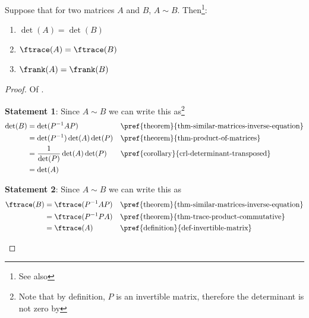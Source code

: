 \begin{thm}\label{thm-similar-matrix-properties:1}
	Suppose that for two matrices $A$ and $B$, $A \sim B$. Then\footnote{See also
		}:
	\begin{enumerate}
		\item $\det(A)=\det(B)$
		\item $\ftrace(A)=\ftrace(B)$
		\item $\frank(A)=\frank(B)$
	\end{enumerate}
\end{thm}

\begin{proof}
	Of .
	\begin{flushleft}
		\textbf{Statement 1}: Since $A \sim B$ we can write this as\footnote{Note
			that by definition, $P$ is an invertible matrix, therefore the determinant
			is not zero by }
		\begin{align*}
			\det(B) & = \det(P^{-1}AP)                  &  & \text{\pref{theorem}{thm-similar-matrices-inverse-equation}} \\
			        & = \det(P^{-1})\det(A)\det(P)      &  & \text{\pref{theorem}{thm-product-of-matrices}}               \\
			        & = \frac{1}{\det(P)}\det(A)\det(P) &  & \text{\pref{corollary}{crl-determinant-transposed}}          \\
			        & = \det(A)
		\end{align*}
	\end{flushleft}
	\begin{flushleft}
		\textbf{Statement 2}: Since $A \sim B$ we can write this as
		\begin{align*}
			\ftrace(B) & = \ftrace(P^{-1}AP) &  & \text{\pref{theorem}{thm-similar-matrices-inverse-equation}} \\
			           & = \ftrace(P^{-1}PA) &  & \text{\pref{theorem}{thm-trace-product-commutative}}         \\
			           & = \ftrace(A)        &  & \text{\pref{definition}{def-invertible-matrix}}
		\end{align*}
	\end{flushleft}
\end{proof}
